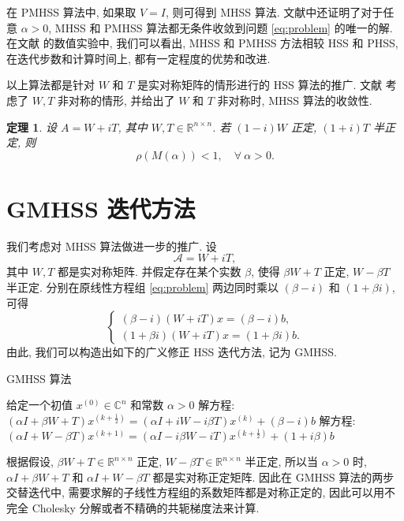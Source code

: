 \documentclass[UTF8]{ctexart}
\theoremstyle{plain}
\newtheorem{theorem}{定理}[section]
\theoremstyle{nonumberplain}
\numberwithin{equation}{section} %
\renewcommand{\C}{\ensuremath{\mathbb{C}}}
\newcommand{\R}{\ensuremath{\mathbb{R}}}
\begin{document}
在 PMHSS 算法中, 如果取 $V=I$, 则可得到 MHSS 算法.
文献中还证明了对于任意 $\alpha >0$,
MHSS 和 PMHSS 算法都无条件收敛到问题 \eqref{eq:problem} 的唯一的解.
在文献 \cite{BBC-10,BBC-11} 的数值实验中, 我们可以看出,
MHSS 和 PMHSS 方法相较 HSS 和 PHSS, 在迭代步数和计算时间上,
都有一定程度的优势和改进.

以上算法都是针对 $W$ 和 $T$ 是实对称矩阵的情形进行的 HSS 算法的推广.
文献 \cite{GW-12} 考虑了 $W, T$ 非对称的情形,
并给出了 $W$ 和 $T$ 非对称时, MHSS 算法的收敛性.
\begin{theorem}
  设 $A=W+iT$, 其中 $W, T \in \R^{n \times n}$.
  若 $(1-i)W$ 正定, $(1+i)T$ 半正定, 则
  $$
    \rho(M(\alpha))<1, \quad\forall \ \alpha>0.
  $$
\end{theorem}

\section{GMHSS 迭代方法}
我们考虑对 MHSS 算法做进一步的推广. 设
$$
  \mathcal{A}=W+iT,
$$
其中 $W, T$ 都是实对称矩阵.
并假定存在某个实数 $\beta$, 使得 $\beta W+T$ 正定, $W-\beta T$ 半正定.
分别在原线性方程组 \eqref{eq:problem} 两边同时乘以
$(\beta -i)$ 和 $(1+\beta i)$, 可得
$$
  \begin{cases}
    (\beta-i)(W+iT)x=(\beta-i)b, \\
    (1+\beta i)(W+iT)x=(1+\beta i)b.
  \end{cases}
$$
由此, 我们可以构造出如下的广义修正 HSS 迭代方法, 记为 GMHSS.

\begin{algorithm}[H]
\caption{GMHSS 算法\label{Alg:GMHSS}}
\begin{algorithmic}[1]
  \State 给定一个初值 $ x^{(0)} \in \C^{n} $ 和常数 $\alpha>0$
  \State 解方程:
    $(\alpha I+\beta W+T)x^{(k+\frac{1}{2})}
     =(\alpha I+iW-i\beta T)x^{(k)}+(\beta -i)b$
  \State 解方程:
    $(\alpha I+W-\beta T)x^{(k+1)}
      =(\alpha I-i\beta W-iT)x^{(k+\frac{1}{2})}+(1+i \beta)b$
  \EndFor
\end{algorithmic}
\end{algorithm}

根据假设, $\beta W+T \in \R^{n \times n}$ 正定,
$W-\beta T \in \R^{n \times n}$ 半正定,
所以当 $\alpha>0$ 时, $\alpha I+\beta W+T$ 和
$\alpha I+W-\beta T$ 都是实对称正定矩阵.
因此在 GMHSS 算法的两步交替迭代中,
需要求解的子线性方程组的系数矩阵都是对称正定的,
因此可以用不完全 Cholesky 分解或者不精确的共轭梯度法来计算.
\end{document}
